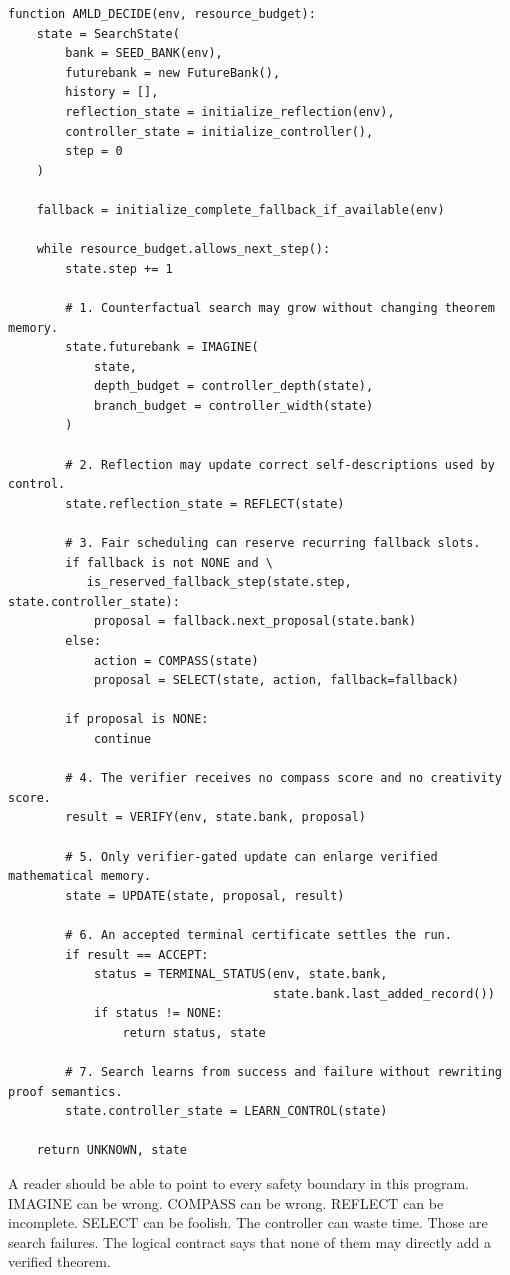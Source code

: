 \documentclass[11pt,openany]{book}
\theoremstyle{definition}
\theoremstyle{remark}
\begin{document}
\begin{lstlisting}[style=pseudo,caption={Full AMLD loop}]
function AMLD_DECIDE(env, resource_budget):
    state = SearchState(
        bank = SEED_BANK(env),
        futurebank = new FutureBank(),
        history = [],
        reflection_state = initialize_reflection(env),
        controller_state = initialize_controller(),
        step = 0
    )

    fallback = initialize_complete_fallback_if_available(env)

    while resource_budget.allows_next_step():
        state.step += 1

        # 1. Counterfactual search may grow without changing theorem memory.
        state.futurebank = IMAGINE(
            state,
            depth_budget = controller_depth(state),
            branch_budget = controller_width(state)
        )

        # 2. Reflection may update correct self-descriptions used by control.
        state.reflection_state = REFLECT(state)

        # 3. Fair scheduling can reserve recurring fallback slots.
        if fallback is not NONE and \
           is_reserved_fallback_step(state.step, state.controller_state):
            proposal = fallback.next_proposal(state.bank)
        else:
            action = COMPASS(state)
            proposal = SELECT(state, action, fallback=fallback)

        if proposal is NONE:
            continue

        # 4. The verifier receives no compass score and no creativity score.
        result = VERIFY(env, state.bank, proposal)

        # 5. Only verifier-gated update can enlarge verified mathematical memory.
        state = UPDATE(state, proposal, result)

        # 6. An accepted terminal certificate settles the run.
        if result == ACCEPT:
            status = TERMINAL_STATUS(env, state.bank,
                                     state.bank.last_added_record())
            if status != NONE:
                return status, state

        # 7. Search learns from success and failure without rewriting proof semantics.
        state.controller_state = LEARN_CONTROL(state)

    return UNKNOWN, state
\end{lstlisting}

A reader should be able to point to every safety boundary in this program. IMAGINE can be wrong. COMPASS can be wrong. REFLECT can be incomplete. SELECT can be foolish. The controller can waste time. Those are search failures. The logical contract says that none of them may directly add a verified theorem.
\end{document}
